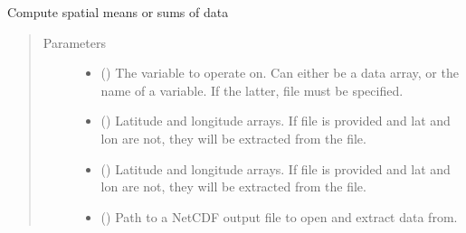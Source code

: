 \documentclass[letterpaper,10pt,english]{sphinxmanual}
\begin{document}
\begin{fulllineitems}
\label{\detokenize{source/exoplasim:exoplasim.gcmt.spatialmath}}
Compute spatial means or sums of data
\begin{quote}\begin{description}
\item[{Parameters}] \leavevmode\begin{itemize}
\item {} 
 (\sphinxstyleliteralemphasis{\sphinxupquote{, }}) \textendash{} The variable to operate on. Can either be a data array, or the name of a variable. If the latter, file must be specified.

\item {} 
 (\sphinxstyleliteralemphasis{\sphinxupquote{, }}) \textendash{} Latitude and longitude arrays. If file is provided and lat and lon are not, they will be
extracted from the file.

\item {} 
 (\sphinxstyleliteralemphasis{\sphinxupquote{, }}) \textendash{} Latitude and longitude arrays. If file is provided and lat and lon are not, they will be
extracted from the file.

\item {} 
 (\sphinxstyleliteralemphasis{\sphinxupquote{, }}) \textendash{} Path to a NetCDF output file to open and extract data from.


\end{itemize}
\end{description}
\end{quote}
\end{fulllineitems}
\end{document}
